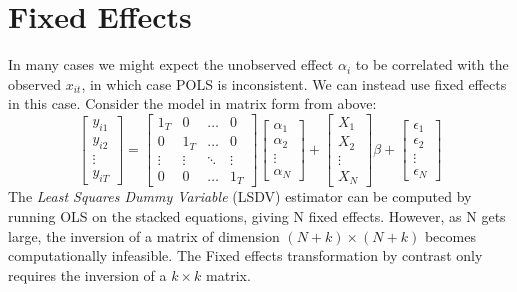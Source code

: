 \documentclass[DIV=14,titlepage=false]{scrreprt}
\begin{document}
\section{Fixed Effects}
In many cases we might expect the unobserved effect $\alpha_i$ to be correlated with the observed $x_{it}$, in which case POLS is inconsistent. We can instead use fixed effects in this case. Consider the model in matrix form from above:
\[
    \begin{bmatrix}
        y_{i1} \\ y_{i2} \\ \vdots \\ y_{iT}
    \end{bmatrix} = \begin{bmatrix}
        1_T & 0 & \ldots & 0 \\
        0 & 1_T & \ldots & 0 \\
        \vdots & \vdots & \ddots & \vdots \\
        0 & 0 & \ldots & 1_T
    \end{bmatrix} \begin{bmatrix}
        \alpha_1 \\ \alpha_2 \\ \vdots \\ \alpha_N
    \end{bmatrix} + \begin{bmatrix}
        X_1 \\
        X_2 \\
        \vdots \\
        X_N
    \end{bmatrix} \beta + \begin{bmatrix}
        \epsilon_1 \\
        \epsilon_2 \\
        \vdots \\
        \epsilon_N
    \end{bmatrix}
\]
The \textit{Least Squares Dummy Variable} (LSDV) estimator can be computed by running OLS on the stacked equations, giving N fixed effects. However, as N gets large, the inversion of a matrix of dimension $(N+k) \times (N+k)$ becomes computationally infeasible. The Fixed effects transformation by contrast only requires the inversion of a $k \times k$ matrix.
\end{document}
